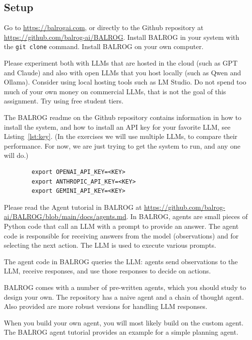 \documentclass[a4]{article}
\begin{document}
\subsection{Setup}
Go to \url{https://balrogai.com}, or directly to the Github repository at \url{https://github.com/balrog-ai/BALROG}.
Install BALROG in your system with the \verb|git clone| command.  
Install BALROG on your own computer. 

Please experiment both with LLMs that are hosted in the cloud (such as GPT and Claude) and also with open LLMs that you host locally (such as Qwen and Ollama). Consider using local hosting tools such as LM Studio.
Do not spend too much of your own money on commercial LLMs, that is not the goal of this assignment. Try using free student tiers.

The BALROG readme on the Github repository contains information in how to install the system, and how to install an API key for your favorite LLM, see Listing~\ref{lst:key}. (In the exercises we will use multiple LLMs, to compare their performance. For now, we are just trying to get the system to run, and any one will do.)
\begin{listing}
    \begin{verbatim}
        export OPENAI_API_KEY=<KEY>
        export ANTHROPIC_API_KEY=<KEY>
        export GEMINI_API_KEY=<KEY>
    \end{verbatim}
    \caption{Installing the API key}\label{lst:key}
\end{listing}

Please read the Agent tutorial in BALROG at \url{https://github.com/balrog-ai/BALROG/blob/main/docs/agents.md}. In BALROG, agents are small pieces of Python code that call  an LLM with a prompt to provide an answer. The agent code is  responsible for receiving answers from the model (observations) and for  selecting the next action. The LLM is used to execute various prompts.  


The agent code in BALROG queries  the LLM: agents send observations to the LLM, receive responses, and use those responses to decide on actions.

BALROG comes with a number of pre-written agents, which you should study to design your own. The repository has a naive agent and a chain of thought agent. Also provided are more robust versions for handling LLM responses. 


When you build your own agent, you will most likely build on the custom agent. 
The BALROG agent tutorial provides an example for a simple planning agent.
\end{document}

